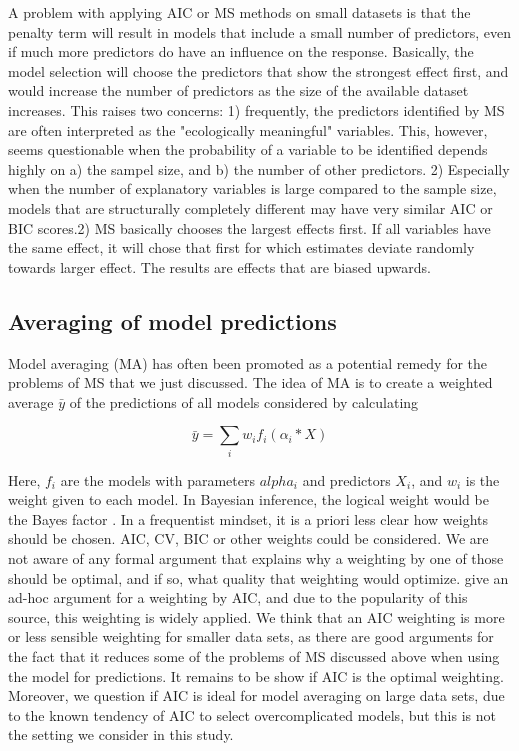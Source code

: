 \documentclass[5p]{elsarticle}
\begin{document}
A problem with applying AIC or MS methods on small datasets is that the penalty term will result in models that include a small number of predictors, even if much more predictors do have an influence on the response. Basically, the model selection will choose the predictors that show the strongest effect first, and would increase the number of predictors as the size of the available dataset increases. This raises two concerns: 1) frequently, the predictors identified by MS are often interpreted as the "ecologically meaningful" variables. This, however, seems questionable when the probability of a variable to be identified depends highly on a) the sampel size, and b) the number of other predictors. 2) Especially when the number of explanatory variables is large compared to the sample size, models that are structurally completely different may have very similar AIC or BIC scores.2) MS basically chooses the largest effects first. If all variables have the same effect, it will chose that first for which estimates deviate randomly towards larger effect. The results are effects that are biased upwards. 

\subsection{Averaging of model predictions}

Model averaging (MA) has often been promoted as a potential remedy for the problems of MS that we just discussed. The idea of MA is to create a weighted average $\bar{y}$ of the predictions of all models considered by calculating

\begin{equation}
\bar{y} = \sum_i w_i f_i(\alpha_i * X)
\label{eq: averaged predictions}
\end{equation}

Here, ${f_i}$ are the models with parameters $alpha_i$ and predictors $X_i$, and $w_i$ is the weight given to each model. In Bayesian inference, the logical weight would be the Bayes factor \citep{Kass-BayesFactors-1995}. In a frequentist mindset, it is a priori less clear how weights should be chosen. AIC, CV, BIC or other weights could be considered. We are not aware of any formal argument that explains why a weighting by one of those should be optimal, and if so, what quality that weighting would optimize. \citet{Burnham-Modelselectionand-2002} give an ad-hoc argument for a weighting by AIC, and due to the popularity of this source, this weighting is widely applied. We think that an AIC weighting is more or less sensible weighting for smaller data sets, as there are good arguments for the fact that it reduces some of the problems of MS discussed above when using the model for predictions. It remains to be show if AIC is the optimal weighting. Moreover, we question if AIC is ideal for model averaging on large data sets, due to the known tendency of AIC to select overcomplicated models, but this is not the setting we consider in this study.
\end{document}
